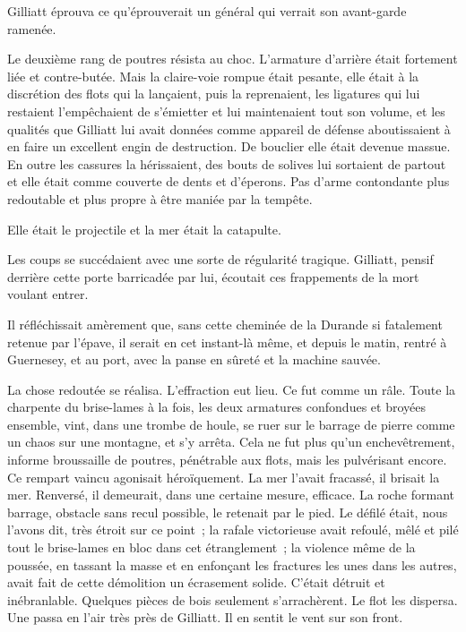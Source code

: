 \documentclass[french,twoside]{book} %
\begin{document}
Gilliatt éprouva ce qu’éprouverait un général qui verrait son avant-garde ramenée.\par
Le deuxième rang de poutres résista au choc. L’armature d’arrière était fortement liée et contre-butée. Mais la claire-voie rompue était pesante, elle était à la discrétion des flots qui la lançaient, puis la reprenaient, les ligatures qui lui restaient l’empêchaient de s’émietter et lui maintenaient tout son volume, et les qualités que Gilliatt lui avait données comme appareil de défense aboutissaient à en faire un excellent engin de destruction. De bouclier elle était devenue massue. En outre les cassures la hérissaient, des bouts de solives lui sortaient de partout et elle était comme couverte de dents et d’éperons. Pas d’arme contondante plus redoutable et plus propre à être maniée par la tempête.\par
Elle était le projectile et la mer était la catapulte.\par
Les coups se succédaient avec une sorte de régularité tragique. Gilliatt, pensif derrière cette porte  barricadée par lui, écoutait ces frappements de la mort voulant entrer.\par
Il réfléchissait amèrement que, sans cette cheminée de la Durande si fatalement retenue par l’épave, il serait en cet instant-là même, et depuis le matin, rentré à Guernesey, et au port, avec la panse en sûreté et la machine sauvée.\par
La chose redoutée se réalisa. L’effraction eut lieu. Ce fut comme un râle. Toute la charpente du brise-lames à la fois, les deux armatures confondues et broyées ensemble, vint, dans une trombe de houle, se ruer sur le barrage de pierre comme un chaos sur une montagne, et s’y arrêta. Cela ne fut plus qu’un enchevêtrement, informe broussaille de poutres, pénétrable aux flots, mais les pulvérisant encore. Ce rempart vaincu agonisait héroïquement. La mer l’avait fracassé, il brisait la mer. Renversé, il demeurait, dans une certaine mesure, efficace. La roche formant barrage, obstacle sans recul possible, le retenait par le pied. Le défilé était, nous l’avons dit, très étroit sur ce point ; la rafale victorieuse avait refoulé, mêlé et pilé tout le brise-lames en bloc dans cet étranglement ; la violence même de la poussée, en tassant la masse et en enfonçant les fractures les unes dans les autres, avait fait de cette démolition un écrasement solide. C’était détruit et inébranlable. Quelques pièces de bois seulement s’arrachèrent. Le flot les dispersa. Une passa en l’air très près de Gilliatt. Il en sentit le vent sur son front.\par
\end{document}
